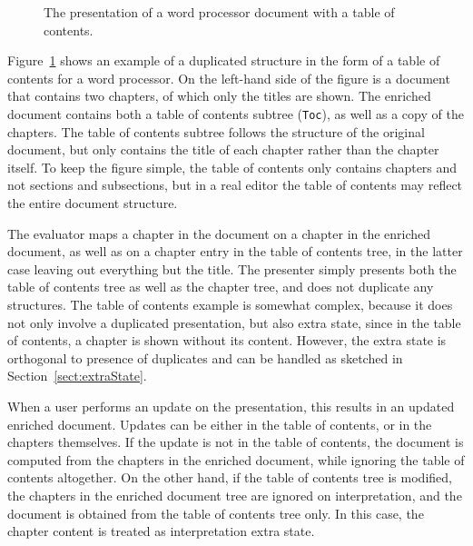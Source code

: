 \begin{figure}
\begin{center}
\begin{center}
%
%
\end{center}
\caption{The presentation of a word processor document with a table of contents.}\label{duplicatesExample} 
\end{center}
\end{figure}


Figure~\ref{duplicatesExample} shows an example of a duplicated structure in the form of a table of contents for a word processor. On the left-hand side of the figure is a document that contains two chapters, of which only the titles are shown. The enriched document contains both a table of contents subtree (\verb|Toc|), as well as a copy of the chapters. The table of contents subtree follows the structure of the original document, but only contains the title of each chapter rather than the chapter itself. To keep the figure simple, the table of contents only contains chapters and not sections and subsections, but in a real editor the table of contents may reflect the entire document structure. 

The evaluator maps a chapter in the document on a chapter in the enriched document, as well as on a chapter entry in the table of contents tree, in the latter case leaving out everything but the title. The presenter simply presents both the table of contents tree as well as the chapter tree, and does not duplicate any structures. The table of contents example is somewhat complex, because it does not only involve a duplicated presentation, but also extra state, since in the table of contents, a chapter is shown without its content. However, the extra state is orthogonal to presence of duplicates and can be handled as sketched in  Section~\ref{sect:extraState}.

When a user performs an update on the presentation, this results in an updated enriched document. Updates can be either in the table of contents, or in the chapters themselves. If the update is not in the table of contents, the document is computed from the chapters in the enriched document, while ignoring the table of contents altogether. On the other hand, if the table of contents tree is modified, the chapters in the enriched document tree are ignored on interpretation, and the document is obtained from the table of contents tree only. In this case, the chapter content is treated as interpretation extra state. 

